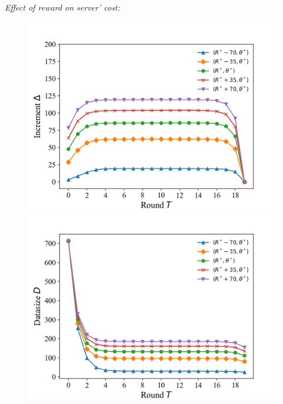 \documentclass{article}
\theoremstyle{plain}
\theoremstyle{definition}
\theoremstyle{remark}
\begin{document}
\textit{Effect of reward on server' cost:}
\begin{figure}
	\begin{minipage}{0.33\linewidth}
		\vspace{3pt}
		\centerline{\includegraphics[width=\textwidth]{figures/figure_55_A.png}}
	\end{minipage}
	\begin{minipage}{0.33\linewidth}
		\vspace{3pt}
		\centerline{\includegraphics[width=\textwidth]{figures/figure_55_B.png}}
	\end{minipage}
  \begin{minipage}{0.33\linewidth}

\end{minipage}
\end{figure}
\end{document}
